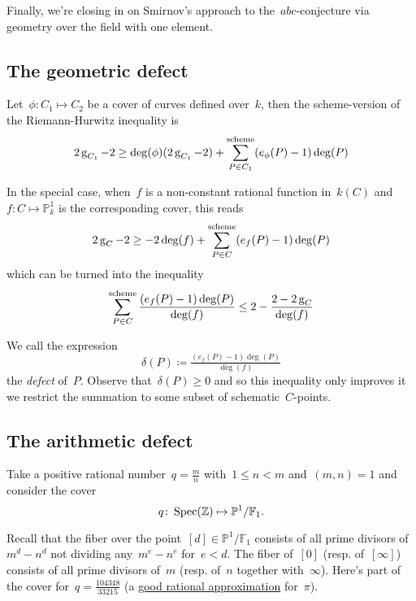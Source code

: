 Finally, we're closing in on Smirnov's approach to the~$abc$-conjecture via geometry over the field with one element.

\subsection{The geometric defect}

Let~$\phi\colon C_1 \mapsto C_2$ be a cover of curves defined over~$k$, then the scheme-version of the Riemann-Hurwitz inequality is
\begin{equation}
  2 \operatorname{g}_{C_1} - 2 \geq \deg(\phi) (2 \operatorname{g}_{C_1} -2) + \sum^{\text{scheme}}_{P \in C_1} (e_{\phi}(P)-1) \deg(P)
\end{equation}

In the special case, when~$f$ is a non-constant rational function in~$k(C)$ and~$f\colon C \mapsto \mathbb{P}^1_k$ is the corresponding cover, this reads
\begin{equation}
  2\operatorname{g}_C-2 \geq -2 \deg(f) + \sum^{\text{scheme}}_{P \in C} (e_f(P)-1) \deg(P)
\end{equation}
which can be turned into the inequality
\begin{equation}
  \sum^{\text{scheme}}_{P \in C} \frac{(e_f(P)-1) \deg(P)}{\deg(f)} \leq 2 - \frac{2-2\operatorname{g}_C}{\deg(f)}
\end{equation}

We call the expression
\begin{equation}
  \delta(P) \coloneqq \tfrac{(e_f(P)-1) \deg(P)}{\deg(f)}  
\end{equation}
the \emph{defect} of~$P$. Observe that~$\delta(P) \geq 0$ and so this inequality only improves it we restrict the summation to some subset of schematic~$C$-points.

\subsection{The arithmetic defect}

Take a positive rational number~$q = \frac{m}{n}$ with~$1 \leq n < m$ and~$(m,n)=1$ and consider the cover
\begin{equation}
  q\colon\operatorname{Spec}(\mathbb{Z}) \mapsto \mathbb{P}^1 / \mathbb{F}_1.
\end{equation}

Recall that the fiber over the point~$[d] \in \mathbb{P}^1 / \mathbb{F}_1$ consists of all prime divisors of~$m^d-n^d$ not dividing any~$m^e-n^e$ for~$e < d$. The fiber of~$[0]$ (resp. of~$[\infty]$) consists of all prime divisors of~$m$ (resp. of~$n$ together with~$\infty$). Here's part of the cover for~$q=\frac{104348}{33215}$ (a \href{http://mathworld.wolfram.com/PiApproximations.html}{good rational approximation} for~$\pi$).

